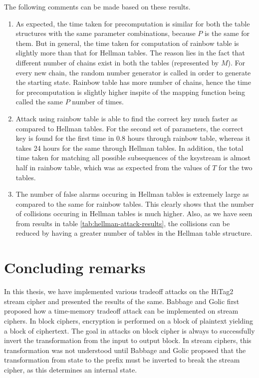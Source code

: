 The following comments can be made based on these results.
\begin{enumerate}
\item As expected, the time taken for precomputation is similar for both the table structures with the same parameter combinations, because $P$ is the same for them. But in general, the time taken for computation of rainbow table is slightly more than that for Hellman tables. The reason lies in the fact that different number of chains exist in both the tables (represented by $M$). For every new chain, the random number generator is called in order to generate the starting state. Rainbow table has more number of chains, hence the time for precomputation is slightly higher inspite of the mapping function being called the same $P$ number of times. 
  
\item Attack using rainbow table is able to find the correct key much faster as compared to Hellman tables. For the second set of parameters, the correct key is found for the first time in 0.8 hours through rainbow table, whereas it takes 24 hours for the same through Hellman tables. In addition, the total time taken for matching all possible subsequences of the ksystream is almost half in rainbow table, which was as expected from the values of $T$ for the two tables.

\item The number of false alarms occuring in Hellman tables is extremely large as compared to the same for rainbow tables. This clearly shows that the number of collisions occuring in Hellman tables is much higher. Also, as we have seen from results in table \ref{tab:hellman-attack-results}, the collisions can be reduced by having a greater number of tables in the Hellman table structure.
\end{enumerate}
\section{Concluding remarks}

In this thesis, we have implemented various tradeoff attacks on the HiTag2 stream cipher and presented the results of the same. Babbage and Golic first proposed how a time-memory tradeoff attack can be implemented on stream ciphers. In block ciphers, encryption is performed on a block of plaintext yielding a block of ciphertext. The goal in attacks on block cipher is always to successfully invert the transformation from the input to output block. In stream ciphers, this transformation was not understood until Babbage and Golic proposed that the transformation from state to the prefix must be inverted to break the stream cipher, as this determines an internal state. 

